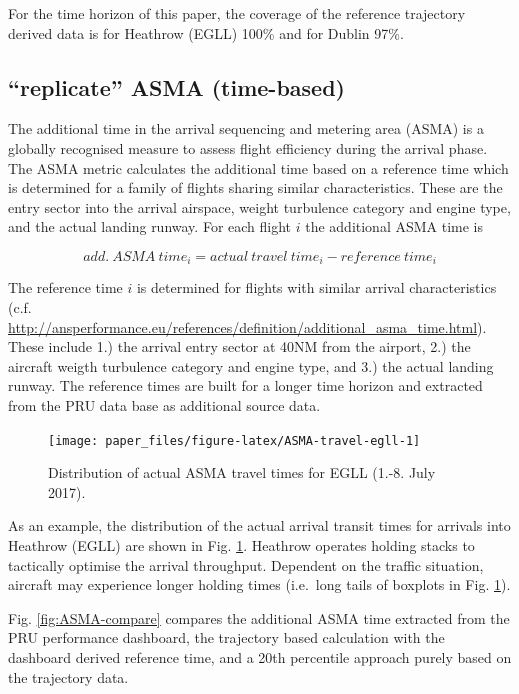 \documentclass[conference,final,a4paper,]{IEEEtran}
\begin{document}
For the time horizon of this paper, the coverage of the reference
trajectory derived data is for Heathrow (EGLL) 100\% and for Dublin
97\%.

\subsection{\texorpdfstring{``replicate'' ASMA
(time-based)}{replicate ASMA (time-based)}}\label{replicate-asma-time-based}

The additional time in the arrival sequencing and metering area (ASMA)
is a globally recognised measure to assess flight efficiency during the
arrival phase. The ASMA metric calculates the additional time based on a
reference time which is determined for a family of flights sharing
similar characteristics. These are the entry sector into the arrival
airspace, weight turbulence category and engine type, and the actual
landing runway. For each flight \(i\) the additional ASMA time is

\[{add.~ASMA~time}_i = {actual~travel~time}_i - {reference~time}_i\]

The reference time \(i\) is determined for flights with similar arrival
characteristics (c.f.
\url{http://ansperformance.eu/references/definition/additional_asma_time.html}).
These include 1.) the arrival entry sector at 40NM from the airport, 2.)
the aircraft weigth turbulence category and engine type, and 3.) the
actual landing runway. The reference times are built for a longer time
horizon and extracted from the PRU data base as additional source data.




\begin{figure}[hbt]

{\centering \texttt{[image: paper\_files/figure-latex/ASMA-travel-egll-1]} 

}

\caption{Distribution of actual ASMA travel times for EGLL
(1.-8. July 2017).}\label{fig:ASMA-travel-egll}
\end{figure}

As an example, the distribution of the actual arrival transit times for
arrivals into Heathrow (EGLL) are shown in Fig.
\ref{fig:ASMA-travel-egll}. Heathrow operates holding stacks to
tactically optimise the arrival throughput. Dependent on the traffic
situation, aircraft may experience longer holding times (i.e.~long tails
of boxplots in Fig. \ref{fig:ASMA-travel-egll}).

Fig. \ref{fig:ASMA-compare} compares the additional ASMA time extracted
from the PRU performance dashboard, the trajectory based calculation
with the dashboard derived reference time, and a 20th percentile
approach purely based on the trajectory data.
\end{document}
